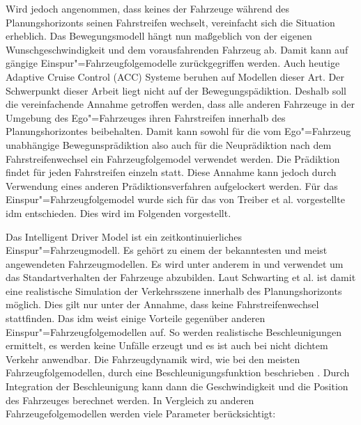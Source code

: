 Wird jedoch angenommen, dass keines der Fahrzeuge w\"ahrend des Planungshorizonts seinen Fahrstreifen wechselt, vereinfacht sich die Situation erheblich.
Das Bewegungsmodell h\"angt nun ma{\ss}geblich von der eigenen Wunschgeschwindigkeit und dem vorausfahrenden Fahrzeug ab.
Damit kann auf g\"angige Einspur"=Fahrzeugfolgemodelle zur\"uckgegriffen werden.
Auch heutige Adaptive Cruise Control (ACC) Systeme beruhen auf Modellen dieser Art.
Der Schwerpunkt dieser Arbeit liegt nicht auf der Bewegungsp\"adiktion.
Deshalb soll die vereinfachende Annahme getroffen werden, dass alle anderen Fahrzeuge in der Umgebung des Ego"=Fahrzeuges ihren Fahrstreifen innerhalb des Planungshorizontes beibehalten.
Damit kann sowohl f\"ur die vom Ego"=Fahrzeug unabh\"angige Bewegunspr\"adiktion also auch f\"ur die Neupr\"adiktion nach dem Fahrstreifenwechsel ein Fahrzeugfolgemodel verwendet werden.
Die Pr\"adiktion findet f\"ur jeden Fahrstreifen einzeln statt.
Diese Annahme kann jedoch durch Verwendung eines anderen Pr\"adiktionsverfahren aufgelockert werden.
F\"ur das Einspur"=Fahrzeugfolgemodel wurde sich f\"ur das von Treiber et al. \cite{Treiber2000} vorgestellte \gls{idm} entschieden.
Dies wird im Folgenden vorgestellt.


Das Intelligent Driver Model ist ein zeitkontinuierliches Einspur"=Fahrzeugmodell.
Es geh\"ort zu einem der bekanntesten und meist angewendeten Fahrzeugmodellen.
Es wird unter anderem in \cite{Schwarting2014} und \cite{Hubmann2018} verwendet um das Standartverhalten der Fahrzeuge abzubilden.
Laut Schwarting et al. \cite{Schwarting2014} ist damit eine realistische Simulation der Verkehrsszene innerhalb des Planungshorizonts m\"oglich.
Dies gilt nur unter der Annahme, dass keine Fahrstreifenwechsel stattfinden.
Das \gls{idm} weist einige Vorteile gegen\"uber anderen Einspur"=Fahrzeugfolgemodellen auf.
So werden realistische Beschleunigungen ermittelt, es werden keine Unf\"alle erzeugt und es ist auch bei nicht dichtem Verkehr anwendbar.
Die Fahrzeugdynamik wird, wie bei den meisten Fahrzeugfolgemodellen, durch eine Beschleunigungsfunktion beschrieben \cite{Treiber2000}.
Durch Integration der Beschleunigung kann dann die Geschwindigkeit und die Position des Fahrzeuges berechnet werden.
In Vergleich zu anderen Fahrzeugefolgemodellen werden viele Parameter ber\"ucksichtigt:

